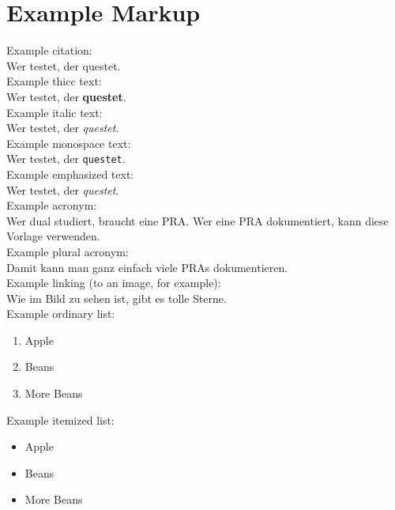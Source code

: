 %
%

\chapter{Example Markup}

Example citation:\\
Wer testet, der questet.\cite{bib:vodafone-legt-in-pirmasens}\\

Example thicc text:\\
Wer testet, der \textbf{questet}.\\

Example italic text:\\
Wer testet, der \textit{questet}.\\

Example monospace text:\\
Wer testet, der \texttt{questet}.\\

Example emphasized text:\\
Wer testet, der \emph{questet}.\\

Example acronym:\\
Wer dual studiert, braucht eine \ac{PRA}. Wer eine \ac{PRA} dokumentiert, kann diese Vorlage verwenden.\\

Example plural acronym:\\
Damit kann man ganz einfach viele \acp{PRA} dokumentieren.\\

Example linking (to an image, for example):\\
Wie im Bild  zu sehen ist, gibt es tolle Sterne.\\

Example ordinary list:\\
\begin{enumerate}
    \item Apple
    \item Beans
    \item More Beans
\end{enumerate}

Example itemized list:\\
\begin{itemize}
    \item Apple
    \item Beans
    \item More Beans
\end{itemize}

